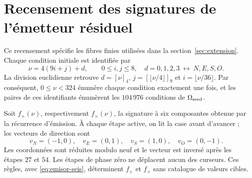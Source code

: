 \section{Recensement des signatures de l’émetteur résiduel}
\label{app:firmas-emision}

Ce recensement spécifie les fibres finies utilisées dans la section~\ref{sec:extension}.
Chaque condition initiale est identifiée par
\[
 \nu=4(9i+j)+d,\qquad 0\leq i,j\leq8,\quad
 d=0,1,2,3\ \longleftrightarrow\ N,E,S,O.
\]
La division euclidienne retrouve \(d=[\nu]_4\), \(j=[\lfloor\nu/4\rfloor]_9\)
et \(i=\lfloor\nu/36\rfloor\). Par conséquent, \(0\leq\nu<324\) énumère
chaque condition exactement une fois, et les paires de ces identifiants
énumèrent les \(104\,976\) conditions de \(\Omega_{\rm seed}\).

Soit \(f_+(\nu)\), respectivement \(f_\times(\nu)\), la signature à six
composantes obtenue par la récurrence d’émission. À chaque étape active, on lit
la case avant d’avancer ; les vecteurs de direction sont
\[
 v_N=(-1,0),\quad v_E=(0,1),\quad v_S=(1,0),\quad v_O=(0,-1).
\]
Les coordonnées sont réduites modulo neuf et le vecteur est inversé après les étapes \(27\) et \(54\). Les étapes de phase zéro ne déplacent aucun des curseurs. Ces règles, avec \eqref{eq:emisor-seis}, déterminent \(f_+\) et \(f_\times\) sans catalogue de valeurs cibles.

